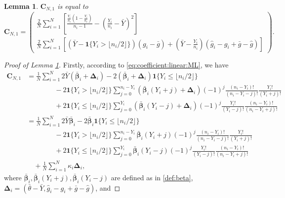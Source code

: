 \documentclass[12pt,letterpaper]{article}
\newtheorem{lemma}{Lemma}[section]
\begin{document}
\begin{lemma}\label{lemma:linear-term:rewritten}
$\mathbf{C}_{N,1}$ is equal to
$$\displaystyle\mathbf{C}_{N,1}=\begin{pmatrix}
    \displaystyle\frac{2}{N}\sum_{i=1}^N\left[\frac{\tfrac{Y_i}{n_i}\left(1-\tfrac{Y_i}{n_i}\right)}{n_i-1}-\left(\tfrac{Y_i}{n_i}-\bar{Y}\right)^2\right]\\
    \displaystyle\frac{2}{N}\sum_{i=1}^N\left[(\bar{Y}-\mathbf{1}\{Y_i>\lfloor n_i/2\rfloor\})(g_i-\bar{g})+\left(\bar{Y}-\tfrac{Y_i}{n_i}\right)(\hat{g}_i-g_i+\bar{g}-\hat{g})\right]
\end{pmatrix}.$$
\end{lemma}
\begin{proof}[Proof of Lemma \ref{lemma:linear-term:rewritten}]
Firstly, according to \eqref{eq:coefficient:linear:ML}, we have
\begin{equation}\label{eq:C:m,1:one-sample}
\begin{array}{rl}
\mathbf{C}_{N,1}\!\!\!\!\!\!&\displaystyle=\frac{1}{N}\sum_{i=1}^N2\bar{Y}(\boldsymbol{\bar{\beta}}_i+\mathbf{\Delta}_i)-2(\bar{\boldsymbol{\beta}}_i+\mathbf{\Delta}_i)\mathbf{1}\{Y_i\leq\lfloor n_i/2\rfloor\}\\
&\displaystyle\quad\quad\quad\quad-2\mathbf{1}\{Y_i>\lfloor n_i/2\rfloor\}\sum_{j=0}^{n_i-Y_i}(\boldsymbol{\bar{\beta}}_i(Y_i+j)+\mathbf{\Delta}_i)(-1)^j\frac{(n_i-Y_i)!}{(n_i-Y_i-j)!}\frac{Y_i!}{(Y_i+j)!}\\
&\displaystyle\quad\quad\quad\quad+2\mathbf{1}\{Y_i\leq\lfloor n_i/2\rfloor\}\sum_{j=0}^{Y_i}(\boldsymbol{\bar{\beta}}_i(Y_i-j)+\mathbf{\Delta}_i)(-1)^j\frac{Y_i!}{(Y_i-j)!}\frac{(n_i-Y_i)!}{(n_i-Y_i+j)!}\\
&\displaystyle=\frac{1}{N}\sum_{i=1}^N2\bar{Y}\boldsymbol{\bar{\beta}}_i-2\bar{\boldsymbol{\beta}}_i\mathbf{1}\{Y_i\leq\lfloor n_i/2\rfloor\}\\
&\displaystyle\quad\quad\quad\quad-2\mathbf{1}\{Y_i>\lfloor n_i/2\rfloor\}\sum_{j=0}^{n_i-Y_i}\boldsymbol{\bar{\beta}}_i(Y_i+j)(-1)^j\frac{(n_i-Y_i)!}{(n_i-Y_i-j)!}\frac{Y_i!}{(Y_i+j)!}\\
&\displaystyle\quad\quad\quad\quad+2\mathbf{1}\{Y_i\leq\lfloor n_i/2\rfloor\}\sum_{j=0}^{Y_i}\boldsymbol{\bar{\beta}}_i(Y_i-j)(-1)^j\frac{Y_i!}{(Y_i-j)!}\frac{(n_i-Y_i)!}{(n_i-Y_i+j)!}\\
&\quad\displaystyle+\frac{1}{N}\sum_{i=1}^N\kappa_i\mathbf{\Delta}_i,
\end{array}
\end{equation}
where $\bar{\boldsymbol{\beta}}_i, \bar{\boldsymbol{\beta}}_i(Y_i+j), \bar{\boldsymbol{\beta}}_i(Y_i-j)$ are defined as in \eqref{def:beta}, $\mathbf{\Delta}_i=(\bar{\theta}-\bar{Y},\hat{g}_i-g_i+\bar{g}-\hat{g})$, and 

\end{proof}
\end{document}
